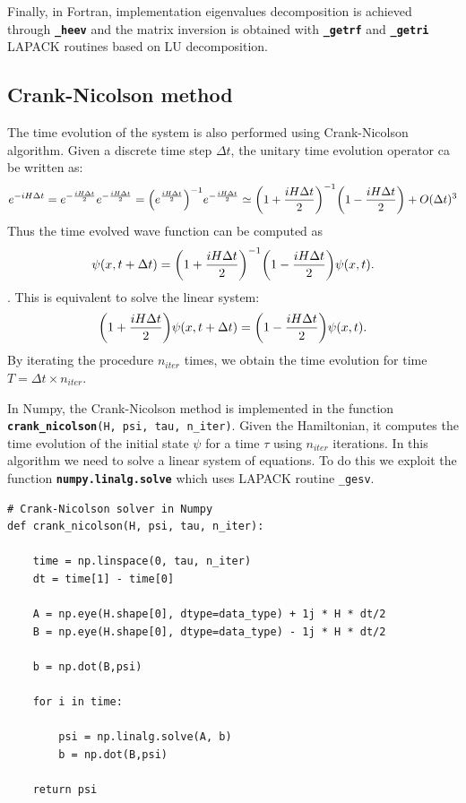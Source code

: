\documentclass[rmp,10pt,onecolumn,fleqn,notitlepage]{revtex4-1}
\begin{document}
Finally, in Fortran, implementation eigenvalues decomposition is achieved through {\bfseries\texttt{\_heev}} and the matrix inversion is obtained with {\bfseries\texttt{\_getrf}} and {\bfseries\texttt{\_getri}} LAPACK routines based on LU decomposition.

\subsection{Crank-Nicolson method}
\label{subsec:crank-nicolson}
The time evolution of the system is also performed using Crank-Nicolson algorithm. Given a discrete time step $\Delta t$, the unitary time evolution operator ca be written as:
\begin{equation}
    e^{-iH\Delta t} = e^{-\frac{iH\Delta t}{2}} e^{-\frac{iH\Delta t}{2}} = \qty( e^{\frac{iH\Delta t}{2}} )^{-1} e^{-\frac{iH\Delta t}{2}}
    \simeq  \qty( 1 + \frac{iH\Delta t}{2} )^{-1} 
    \qty( 1 - \frac{iH\Delta t}{2} ) + O(\Delta t)^3
\end{equation}
Thus the time evolved wave function can be computed as
\begin{equation}
    \psi(x,t+\Delta t) = 
    \qty( 1 + \frac{iH\Delta t}{2} )^{-1} 
    \qty( 1 - \frac{iH\Delta t}{2} ) \psi(x,t).
\end{equation}.
This is equivalent to solve the linear system:
\begin{equation}
    \qty( 1 + \frac{iH\Delta t}{2} )    \psi(x,t+\Delta t) = \qty( 1 - \frac{iH\Delta t}{2} ) \psi(x,t).
\end{equation}
By iterating the procedure $n_{iter}$ times, we obtain the time evolution for time $T = \Delta t \times n_{iter}$.

In Numpy, the Crank-Nicolson method is implemented in the function {\bfseries\texttt{crank\_nicolson}}\texttt{(H, psi, tau, n\_iter)}. Given the Hamiltonian, it computes the time evolution of the initial state $\psi$ for a time $\tau$ using $n_{iter}$ iterations. In this algorithm we need to solve a linear system of equations. To do this we exploit the function {\bfseries\texttt{numpy.linalg.solve}} which uses LAPACK routine \texttt{\_gesv}. 

\begin{lstlisting}[style=myPython]
# Crank-Nicolson solver in Numpy
def crank_nicolson(H, psi, tau, n_iter):
    
    time = np.linspace(0, tau, n_iter)
    dt = time[1] - time[0]
    
    A = np.eye(H.shape[0], dtype=data_type) + 1j * H * dt/2
    B = np.eye(H.shape[0], dtype=data_type) - 1j * H * dt/2

    b = np.dot(B,psi) 

    for i in time:
        
        psi = np.linalg.solve(A, b)
        b = np.dot(B,psi) 
        
    return psi  
\end{lstlisting}
\end{document}
